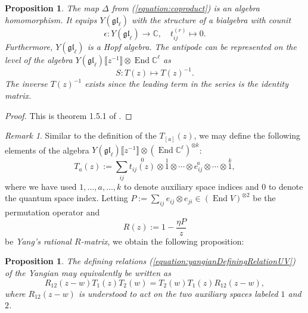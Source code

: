 \documentclass[11pt]{report}
\newtheorem{prop}[theorem]{Proposition}
\theoremstyle{definition}
\theoremstyle{remark}
\newtheorem*{remark}{Remark}
\theoremstyle{remark}
\newcommand{\End}{\operatorname{End}}
\newcommand{\C}{\mathbb{C}}
\begin{document}
\begin{prop}
The map $\Delta$ from (\ref{equation:coproduct}) is an algebra homomorphism. It equips $Y(\mathfrak{gl}_\ell)$ with the structure of a bialgebra with counit
\begin{equation*}
\epsilon: Y(\mathfrak{gl}_\ell) \to \C, \quad t_{ij}^{(r)} \mapsto 0.
\end{equation*}
Furthermore, $Y(\mathfrak{gl}_\ell)$ is a Hopf algebra. The antipode can be represented on the level of the algebra $Y(\mathfrak{gl}_\ell)\llbracket z^{-1} \rrbracket \otimes \End \C^\ell$ as
\begin{equation*}
S: T(z) \mapsto T(z)^{-1}.
\end{equation*}
The inverse $T(z)^{-1}$ exists since the leading term in the series is the identity matrix.
\end{prop}

\begin{proof}
This is theorem 1.5.1 of \cite{book:molev}.
\end{proof}

\begin{remark}
Similar to the definition of the $T_{[a]}(z)$, we may define the following elements of the algebra $Y(\mathfrak{gl}_\ell)\llbracket z^{-1} \rrbracket \otimes (\End \C^\ell)^{\otimes k}$:
\begin{equation*}
T_a(z) := \sum_{ij} \overset{0}{t_{ij}(z)} \otimes \overset{1}{1} \otimes \cdots \otimes \overset{a}{e_{ij}} \otimes \cdots \otimes \overset{k}{1},
\end{equation*}
where we have used $1,...,a,...,k$ to denote auxiliary space indices and $0$ to denote the quantum space index. Letting $P := \sum_{ij} e_{ij} \otimes e_{ji} \in (\End V)^{\otimes 2}$ be the permutation operator and
\begin{equation*}
R(z) := 1 - \frac{\eta P}{z}
\end{equation*}
be \emph{Yang's rational $R$-matrix}, we obtain the following proposition:
\end{remark}

\begin{prop}
The defining relations (\ref{equation:yangianDefiningRelationUV}) of the Yangian may equivalently be written as
\begin{equation}\label{equation:RTTRelation}
R_{12}(z-w) T_1(z) T_2(w) = T_2(w) T_1(z) R_{12}(z-w),
\end{equation}
where $R_{12}(z-w)$ is understood to act on the two auxiliary spaces labeled $1$ and $2$.
\end{prop}
\end{document}
